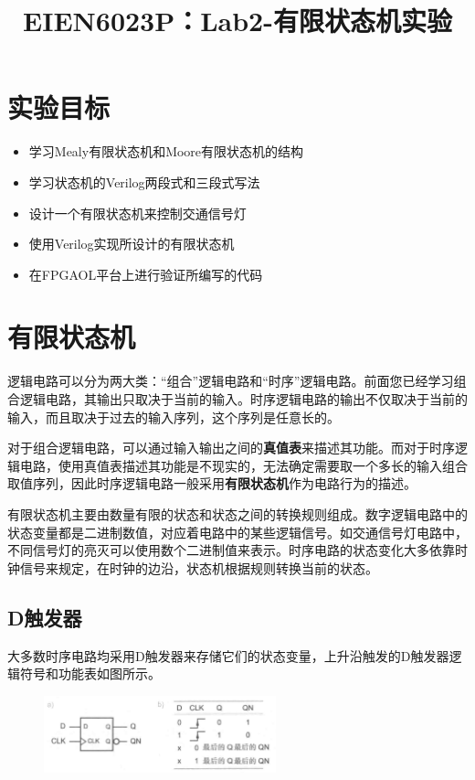 \documentclass{ctexart}
\title{EIEN6023P：Lab2-有限状态机实验}
\author{}
\date{}
\begin{document}
\maketitle

\section{实验目标}
\begin{itemize}
    \item 学习Mealy有限状态机和Moore有限状态机的结构
    \item 学习状态机的Verilog两段式和三段式写法
    \item 设计一个有限状态机来控制交通信号灯
    \item 使用Verilog实现所设计的有限状态机
    \item 在FPGAOL平台上进行验证所编写的代码
\end{itemize}


\section{有限状态机}

逻辑电路可以分为两大类：“组合”逻辑电路和“时序”逻辑电路。前面您已经学习组合逻辑电路，其输出只取决于当前的输入。时序逻辑电路的输出不仅取决于当前的输入，而且取决于过去的输入序列，这个序列是任意长的。

对于组合逻辑电路，可以通过输入输出之间的\textbf{真值表}来描述其功能。而对于时序逻辑电路，使用真值表描述其功能是不现实的，无法确定需要取一个多长的输入组合取值序列，因此时序逻辑电路一般采用\textbf{有限状态机}作为电路行为的描述。

有限状态机主要由数量有限的状态和状态之间的转换规则组成。数字逻辑电路中的状态变量都是二进制数值，对应着电路中的某些逻辑信号。如交通信号灯电路中，不同信号灯的亮灭可以使用数个二进制值来表示。时序电路的状态变化大多依靠时钟信号来规定，在时钟的边沿，状态机根据规则转换当前的状态。

\subsection{D触发器}

大多数时序电路均采用D触发器来存储它们的状态变量，上升沿触发的D触发器逻辑符号和功能表如图所示。

\begin{figure}[H]
    \centering
    \includegraphics[width=0.6\textwidth]{lab2/1.png}
\end{figure}
\end{document}
